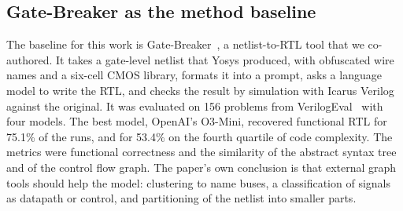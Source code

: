 \documentclass[conference]{IEEEtran}
\begin{document}
\subsection{Gate-Breaker as the method baseline}
\label{sec:re-gb}

The baseline for this work is Gate-Breaker~, a netlist-to-RTL tool
that we co-authored. It takes a gate-level netlist that Yosys produced, with obfuscated wire names
and a six-cell CMOS library, formats it into a prompt, asks a language model to write the RTL,
and checks the result by simulation with Icarus Verilog against the original. It was evaluated
on 156 problems from VerilogEval~ with four models. The best model,
OpenAI's O3-Mini, recovered functional RTL for 75.1\% of the runs, and for 53.4\% on the
fourth quartile of code complexity. The metrics were functional correctness and the similarity of
the abstract syntax tree and of the control flow graph. The paper's own conclusion is that
external graph tools should help the model: clustering to name buses, a classification of signals
as datapath or control, and partitioning of the netlist into smaller parts.
\end{document}
